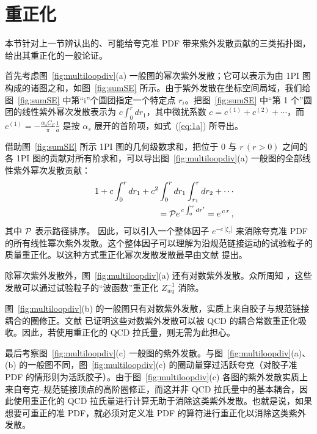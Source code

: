 \section{重正化}
\label{sec:renormalization}

本节针对上一节辨认出的、可能给夸克准 PDF 带来紫外发散贡献的三类拓扑图，给出其重正化的一般论证。

首先考虑图~\ref{fig:multiloopdiv}(a) 一般图的幂次紫外发散；它可以表示为由 1PI 图构成的诸图之和，如图~\ref{fig:sumSE} 所示。由于紫外发散在坐标空间局域，我们给图~\ref{fig:sumSE} 中第``i''个圆团指定一个特定点 $r_i$。把图~\ref{fig:sumSE} 中``第 1 个''圆团的线性紫外幂次发散表示为 $c \int_0^{r} d r_1$，其中微扰系数 $c=c^{(1)}+c^{(2)}+\cdots$，而 $c^{(1)}=-\frac{\alpha_s C_F}{\pi}\frac{1}{a} $ 是按 $\alpha_s$ 展开的首阶项，如式~(\ref{eq:1a}) 所导出。

借助图~\ref{fig:sumSE} 所示 1PI 图的几何级数求和，把位于 0 与 $r\,(r>0)$ 之间的各 1PI 图的贡献对所有阶求和，可以导出图~\ref{fig:multiloopdiv}(a) 一般图的全部线性紫外幂次发散贡献：
\begin{eqnarray}
&\ & 1+ c \int_0^{r} d r_1 + c^2 \int_0^{r} d r_1 \int_{r_1}^{r} d r_2 + \cdots
\nonumber \\
&\ & \hskip 0.3in
= {\cal P} e^{\, c \int_0^r dr'} = e^{\, c\, r}\, ,
\end{eqnarray}
其中 ${\cal P}$ 表示路径排序。
因此，可以引入一个整体因子 $e^{-c\, |\xi_z|}$ 来消除夸克准 PDF 的所有线性幂次紫外发散。这个整体因子可以理解为沿规范链接运动的试验粒子的质量重正化。以这种方式重正化幂次发散发散最早由文献 \cite{Polyakov:1980ca} 提出。

除幂次紫外发散外，图~\ref{fig:multiloopdiv}(a) 还有对数紫外发散。众所周知 \cite{Dotsenko:1979wb}，这些发散可以通过试验粒子的``波函数''重正化 $Z_{wq}^{-1}$ 消除。

图~\ref{fig:multiloopdiv}(b) 的一般图只有对数紫外发散，实质上来自胶子与规范链接耦合的圈修正。文献 \cite{Dotsenko:1979wb} 已证明这些对数紫外发散可以被 QCD 的耦合常数重正化吸收。因此，若使用重正化的 QCD 拉氏量，则无需为此担心。

最后考察图~\ref{fig:multiloopdiv}(c) 一般图的紫外发散。与图~\ref{fig:multiloopdiv}(a)、(b) 的一般图不同，图~\ref{fig:multiloopdiv}(c) 的圈动量穿过活跃夸克（对胶子准 PDF 的情形则为活跃胶子）。由于图~\ref{fig:multiloopdiv}(c) 各图的紫外发散实质上来自夸克--规范链接顶点的高阶圈修正，而这并非 QCD 拉氏量中的基本耦合，因此使用重正化的 QCD 拉氏量进行计算无助于消除这类紫外发散。也就是说，如果想要可重正的准 PDF，就必须对定义准 PDF 的算符进行重正化以消除这类紫外发散。

